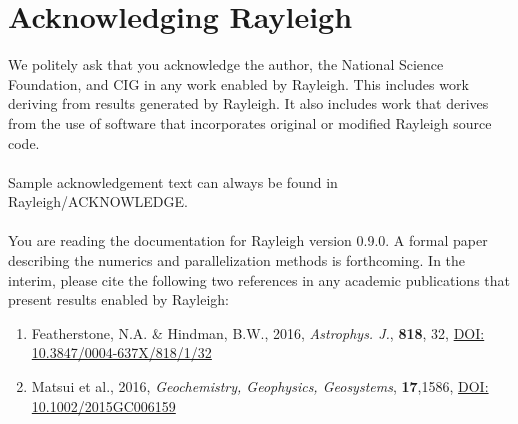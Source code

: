 \documentclass[10pt, letterpaper]{article}
\begin{document}












\section{Acknowledging Rayleigh}
We politely ask that you acknowledge the author, the National Science Foundation, and CIG in any work enabled by Rayleigh.  This includes work deriving from results generated by Rayleigh.  It also includes work that derives from the use of software that incorporates original or modified Rayleigh source code.
\\
\\
Sample acknowledgement text can always be found in Rayleigh/ACKNOWLEDGE.
\\
\\
\noindent You are reading the documentation for Rayleigh version 0.9.0.   A formal paper describing the numerics and parallelization methods is forthcoming.  In the interim, please cite the following two references in any academic publications that present results enabled by Rayleigh:
\begin{enumerate}
\item Featherstone, N.A. \& Hindman, B.W., 2016, \textit{Astrophys. J.}, \textbf{818}, 32, {\color{blue} \href{http://dx.doi.org/10.3847/0004-637X/818/1/32}{DOI: 10.3847/0004-637X/818/1/32}}
\item Matsui et al., 2016, \textit{Geochemistry, Geophysics, Geosystems}, \textbf{17},1586,  {\color{blue} \href{http://dx.doi.org/10.1002/2015GC006159}{DOI: 10.1002/2015GC006159}}
\end{enumerate}
\end{document}
